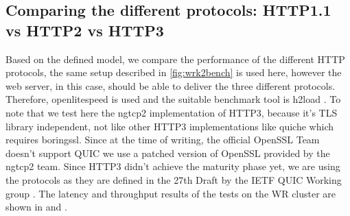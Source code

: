 \documentclass[runningheads]{llncs}
\begin{document}
\subsection{Comparing the different protocols: HTTP1.1 vs HTTP2 vs HTTP3}
Based on the defined model, we compare the performance of the different HTTP protocols, the same setup described in \cref{fig:wrk2bench} is used here, however the web server, in this case, should be able to deliver the three different protocols. Therefore, openlitespeed \cite{openlitespeed} is used and the suitable benchmark tool is h2load \cite{h2load}.
To note that we test here the ngtcp2 \cite{ngtcp2} implementation of HTTP3, because it's TLS library independent, not like other HTTP3 implementations like quiche \cite{quiche} which requires boringssl. Since at the time of writing, the official OpenSSL Team doesn’t support QUIC \cite{opensslquicblog} we use a patched version of OpenSSL provided by the ngtcp2 team.
Since HTTP3 didn't achieve the maturity phase yet, we are using the protocols as they are defined in the 27th Draft by the IETF QUIC Working group \cite{quicwg}.
The latency and throughput results of the tests on the WR cluster are shown in  and .
\vspace{-1em}
\end{document}
